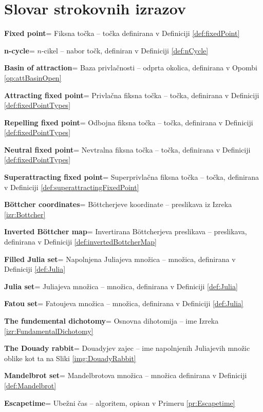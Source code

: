 \documentclass[12pt,a4paper]{amsart}
\theoremstyle{definition} %
\theoremstyle{plain} %
\newcommand{\geslo}[2]{\noindent\textbf{#1}\hspace*{3mm}\hangindent=\parindent\hangafter=1 #2}
\begin{document}
\clearpage

\section*{Slovar strokovnih izrazov}

\geslo {Fixed point} {Fiksna točka -- točka definirana v Definiciji \ref{def:fixedPoint}}

\geslo {n-cycle} {$n$-cikel -- nabor točk, definiran v Definiciji \ref{def:nCycle}}

\geslo {Basin of attraction} {Baza privlačnosti -- odprta okolica, definirana v Opombi \ref{op:attBasinOpen}}

\geslo {Attracting fixed point} {Privlačna fiksna točka -- točka, definirana v Definiciji \ref{def:fixedPointTypes}}

\geslo {Repelling fixed point} {Odbojna fiksna točka -- točka, definirana v Definiciji \ref{def:fixedPointTypes}}

\geslo {Neutral fixed point} {Nevtralna fiksna točka -- točka, definirana v Definiciji \ref{def:fixedPointTypes}}

\geslo {Superattracting fixed point} {Superprivlačna fiksna točka -- točka, definirana v Definiciji \ref{def:superattractingFixedPoint}}

\geslo {B{\"o}ttcher coordinates} {B{\"o}ttcherjeve koordinate -- preslikava iz Izreka \ref{izr:Bottcher}}

\geslo {Inverted B{\"o}ttcher map} {Invertirana B{\"o}ttcherjeva preslikava -- preslikava, definirana v Definiciji \ref{def:invertedBottcherMap}}

\geslo {Filled Julia set} {Napolnjena Juliajeva množica -- množica, definirana v Definiciji \ref{def:Julia}}

\geslo {Julia set} {Juliajeva množica -- množica, definirana v Definiciji \ref{def:Julia}}

\geslo {Fatou set} {Fatoujeva množica -- množica, definirana v Definiciji \ref{def:Julia}}

\geslo {The fundemental dichotomy} {Osnovna dihotomija -- ime Izreka \ref{izr:FundamentalDichotomy}}

\geslo {The Douady rabbit} {Douadyjev zajec -- ime napolnjenih Juliajevih množic oblike kot ta na Sliki \ref{img:DouadyRabbit}}

\geslo {Mandelbrot set} {Mandelbrotova množica -- množica definirana v Definiciji \ref{def:Mandelbrot}}

\geslo{Escapetime} {Ubežni čas -- algoritem, opisan v Primeru \ref{pr:Escapetime}}
\end{document}
